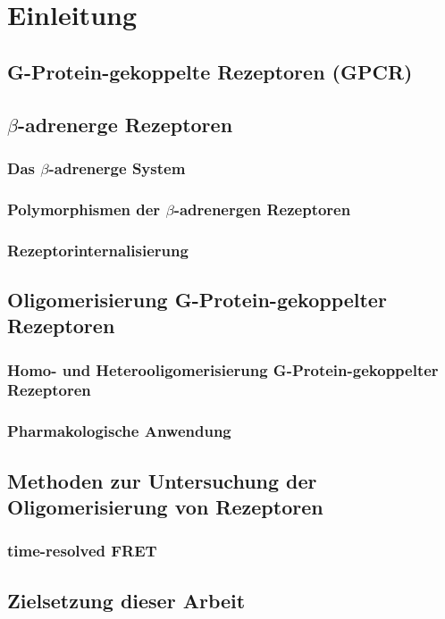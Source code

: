 \chapter{Einleitung}\label{chapter:einleitung}

\section{G-Protein-gekoppelte Rezeptoren (GPCR)}

\section{$\beta$-adrenerge Rezeptoren}
\subsection{Das $\beta$-adrenerge System}
\subsection{Polymorphismen der $\beta$-adrenergen Rezeptoren}
\subsection{Rezeptorinternalisierung}


\section{Oligomerisierung G-Protein-gekoppelter Rezeptoren}
\subsection{Homo- und Heterooligomerisierung G-Protein-gekoppelter Rezeptoren}
\subsection{Pharmakologische Anwendung}

\section{Methoden zur Untersuchung der Oligomerisierung von Rezeptoren}
\subsection{time-resolved FRET}

\section{Zielsetzung dieser Arbeit}